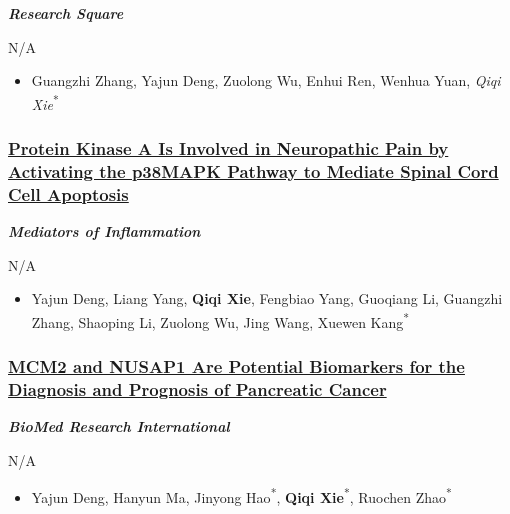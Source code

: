 \documentclass[
]{article}
\providecommand{\tightlist}{%
  \setlength{\itemsep}{0pt}\setlength{\parskip}{0pt}}
\begin{document}
\emph{\textbf{Research Square}}

N/A

\begin{itemize}
\tightlist
\item
  Guangzhi Zhang, Yajun Deng, Zuolong Wu, Enhui Ren, Wenhua Yuan,
  \emph{Qiqi Xie}\textsuperscript{*}
\end{itemize}

\hypertarget{protein-kinase-a-is-involved-in-neuropathic-pain-by-activating-the-p38mapk-pathway-to-mediate-spinal-cord-cell-apoptosis}{%
\subsubsection{\texorpdfstring{\href{https://doi.org/10.1155/2020/6420425}{Protein
Kinase A Is Involved in Neuropathic Pain by Activating the p38MAPK
Pathway to Mediate Spinal Cord Cell
Apoptosis}}{Protein Kinase A Is Involved in Neuropathic Pain by Activating the p38MAPK Pathway to Mediate Spinal Cord Cell Apoptosis}}\label{protein-kinase-a-is-involved-in-neuropathic-pain-by-activating-the-p38mapk-pathway-to-mediate-spinal-cord-cell-apoptosis}}

\emph{\textbf{Mediators of Inflammation}}

N/A

\begin{itemize}
\tightlist
\item
  Yajun Deng, Liang Yang, \textbf{Qiqi Xie}, Fengbiao Yang, Guoqiang Li,
  Guangzhi Zhang, Shaoping Li, Zuolong Wu, Jing Wang, Xuewen
  Kang\textsuperscript{*}
\end{itemize}

\hypertarget{mcm2-and-nusap1-are-potential-biomarkers-for-the-diagnosis-and-prognosis-of-pancreatic-cancer}{%
\subsubsection{\texorpdfstring{\href{https://doi.org/10.1155/2020/8604340}{MCM2
and NUSAP1 Are Potential Biomarkers for the Diagnosis and Prognosis of
Pancreatic
Cancer}}{MCM2 and NUSAP1 Are Potential Biomarkers for the Diagnosis and Prognosis of Pancreatic Cancer}}\label{mcm2-and-nusap1-are-potential-biomarkers-for-the-diagnosis-and-prognosis-of-pancreatic-cancer}}

\textbf{\emph{BioMed Research International}}

N/A

\begin{itemize}
\tightlist
\item
  Yajun Deng, Hanyun Ma, Jinyong Hao\textsuperscript{*}, \textbf{Qiqi
  Xie}\textsuperscript{*}, Ruochen Zhao\textsuperscript{*}
\end{itemize}
\end{document}
